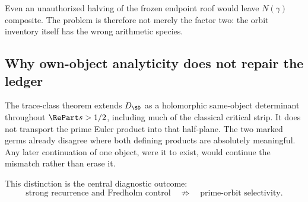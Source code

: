 Even an unauthorized halving of the frozen endpoint roof would leave
\(N(\gamma)\) composite.  The problem is therefore not merely the factor
two: the orbit inventory itself has the wrong arithmetic species.

\subsection{Why own-object analyticity does not repair the ledger}

The trace-class theorem extends \(D_{\SD}\) as a holomorphic same-object
determinant throughout \(\RePart s>1/2\), including much of the classical
critical strip.  It does not transport the prime Euler product into that
half-plane.  The two marked germs already disagree where both defining
products are absolutely meaningful.  Any later continuation of one object,
were it to exist, would continue the mismatch rather than erase it.

This distinction is the central diagnostic outcome:
\[
\text{strong recurrence and Fredholm control}
\quad\not\Longrightarrow\quad
\text{prime-orbit selectivity}.
\]

